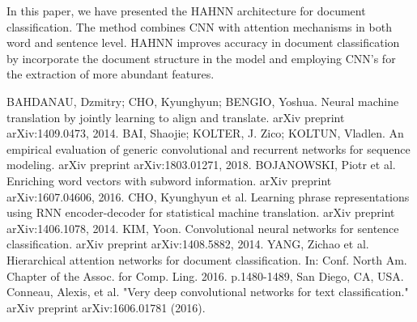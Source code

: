 \documentclass[runningheads]{llncs}
\begin{document}
In this paper, we have presented the HAHNN architecture for document classification. The method combines CNN with attention mechanisms in both word and sentence level. HAHNN improves accuracy in document classification by incorporate the document structure in the model and employing CNN's for the extraction of more abundant features. \\[-8mm] 







\begin{thebibliography}{9}
 BAHDANAU, Dzmitry; CHO, Kyunghyun; BENGIO, Yoshua. Neural machine translation by jointly learning to align and translate. arXiv preprint arXiv:1409.0473, 2014.
 BAI, Shaojie; KOLTER, J. Zico; KOLTUN, Vladlen. An empirical evaluation of generic convolutional and recurrent networks for sequence modeling. arXiv preprint arXiv:1803.01271, 2018.
 BOJANOWSKI, Piotr et al. Enriching word vectors with subword information. arXiv preprint arXiv:1607.04606, 2016.
CHO, Kyunghyun et al. Learning phrase representations using RNN encoder-decoder for statistical machine translation. arXiv preprint arXiv:1406.1078, 2014.
KIM, Yoon. Convolutional neural networks for sentence classification. arXiv preprint arXiv:1408.5882, 2014.
 YANG, Zichao et al. Hierarchical attention networks for document classification. In: Conf. North Am. Chapter of the Assoc. for Comp. Ling. 2016. p.1480-1489, San Diego, CA, USA.
 Conneau, Alexis, et al. "Very deep convolutional networks for text classification." arXiv preprint arXiv:1606.01781 (2016).
\end{thebibliography}
\end{document}
